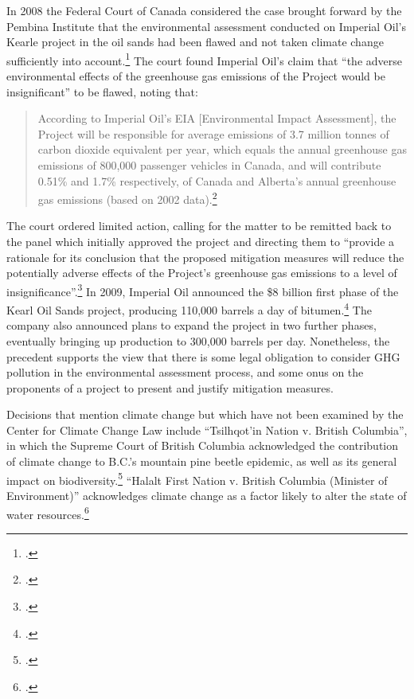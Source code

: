 \documentclass[10pt]{article}
\begin{document}
In 2008 the Federal Court of Canada considered the case brought forward by the Pembina Institute that the environmental assessment conducted on Imperial Oil's Kearle project in the oil sands had been flawed and not taken climate change sufficiently into account.\footcite[][p. 116]{ColumbiaIntl}
The court found Imperial Oil's claim that ``the adverse environmental effects of the greenhouse gas emissions of the Project would be insignificant'' to be flawed, noting that:
\begin{quote}
According to Imperial Oil’s EIA [Environmental Impact Assessment], the Project will be responsible for average emissions of 3.7 million tonnes of carbon dioxide equivalent per year, which equals the annual greenhouse gas emissions of 800,000 passenger vehicles in Canada, and will contribute 0.51\% and 1.7\% respectively, of Canada and Alberta’s annual greenhouse gas emissions (based on 2002 data).\footcite[][]{PembinaAG2008}
\end{quote}
The court ordered limited action, calling for the matter to be remitted back to the panel which initially approved the project and directing them to ``provide a rationale for its conclusion that the proposed mitigation measures will reduce the potentially adverse effects of the Project’s greenhouse gas emissions to a level of insignificance''.\footcite[][]{PembinaAG2008}
In 2009, Imperial Oil announced the \$8 billion first phase of the Kearl Oil Sands project, producing 110,000 barrels a day of bitumen.\footcite[][]{KearlApproved}
The company also announced plans to expand the project in two further phases, eventually bringing up production to 300,000 barrels per day.
Nonetheless, the precedent supports the view that there is some legal obligation to consider GHG pollution in the environmental assessment process, and some onus on the proponents of a project to present and justify mitigation measures.



Decisions that mention climate change but which have not been examined by the Center for Climate Change Law include ``Tsilhqot'in Nation v. British Columbia'', in which the Supreme Court of British Columbia acknowledged the contribution of climate change to B.C.'s mountain pine beetle epidemic, as well as its general impact on biodiversity.\footcite[][p. 358, 406]{Tsilhqotin}
``Halalt First Nation v. British Columbia (Minister of Environment)'' acknowledges climate change as a factor likely to alter the state of water resources.\footcite[][]{Halalt}
\end{document}
